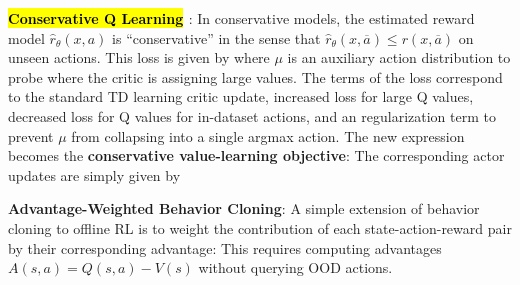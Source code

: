 \documentclass{article}
\begin{document}
  \textbf{\hl{Conservative Q Learning} \cite{kumar2020conservative}}: In conservative models, the estimated reward model $\hat{r}_\theta(x,a)$ is ``conservative'' in the sense that $\hat{r}_\theta(x,\overline{a})\leq r(x,\overline{a})$ on unseen actions. This loss is given by
  where $\mu$ is an auxiliary action distribution to probe where the critic is assigning large values. The terms of the loss correspond to the standard TD learning critic update, increased loss for large Q values, decreased loss for Q values for in-dataset actions, and an regularization term to prevent $\mu$ from collapsing into a single argmax action.
  The new expression becomes the \textbf{conservative value-learning objective}:
  The corresponding actor updates are simply given by

  \textbf{Advantage-Weighted Behavior Cloning}: A simple extension of behavior cloning to offline RL is to weight the contribution of each state-action-reward pair by their corresponding advantage:
  This requires computing advantages $A(s,a)=Q(s,a)-V(s)$ without querying OOD actions.
\end{document}
